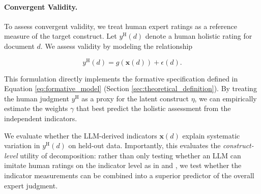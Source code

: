
\paragraph{Convergent Validity.} %
To assess convergent validity, we treat human expert ratings as a reference measure of the target construct. Let $y^{\text{H}}(d)$ denote a human holistic rating for document $d$. We assess validity by modeling the relationship

\begin{equation}\label{eq:convergent_validity_formative}
    y^{\text{H}}(d) = g(\mathbf{x}(d)) + \epsilon(d).
\end{equation}

This formulation directly implements the formative specification defined in Equation \ref{eq:formative_model} (Section \ref{sec:theoretical_definition}). By treating the human judgment $y^{\text{H}}$ as a proxy for the latent construct $\eta$, we can empirically estimate the weights $\gamma$ that best predict the holistic assessment from the independent indicators.

We evaluate whether the LLM-derived indicators $\mathbf{x}(d)$ explain systematic variation in $y^{\text{H}}(d)$ on held-out data. Importantly, this evaluates the \emph{construct-level} utility of decomposition: rather than only testing whether an LLM can imitate human ratings on the indicator level as in \citet{li-fine-grained-2026} and \citet{wang2025evaluating}, we test whether the indicator measurements can be combined into a superior predictor of the overall expert judgment.

